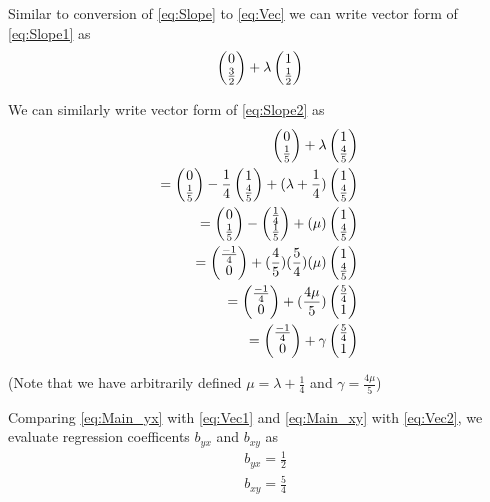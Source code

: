 \documentclass[journal,12pt,twocolumn]{IEEEtran}
\begin{document}
Similar to conversion of
\eqref{eq:Slope}
to
\eqref{eq:Vec}
we can write vector form of
\eqref{eq:Slope1}
as
\begin{align}
  \begin{pmatrix}0\\\frac{3}{2}\end{pmatrix} + \lambda\begin{pmatrix}1\\\frac{1}{2}\end{pmatrix}
  \label{eq:Vec1}  
\end{align}

We can similarly write vector form of
\eqref{eq:Slope2}
as
\begin{align}
  \begin{pmatrix}0\\\frac{1}{5}\end{pmatrix} + \lambda\begin{pmatrix}1\\\frac{4}{5}\end{pmatrix}
  \\
  = \begin{pmatrix}0\\\frac{1}{5}\end{pmatrix} - \frac{1}{4}\begin{pmatrix}1\\\frac{4}{5}\end{pmatrix} + (\lambda + \frac{1}{4})\begin{pmatrix}1\\\frac{4}{5}\end{pmatrix}
  \\
  = \begin{pmatrix}0\\\frac{1}{5}\end{pmatrix} - \begin{pmatrix}\frac{1}{4}\\\frac{1}{5}\end{pmatrix} + (\mu)\begin{pmatrix}1\\\frac{4}{5}\end{pmatrix}
  \\
  = \begin{pmatrix}\frac{-1}{4}\\0\end{pmatrix} + (\frac{4}{5})(\frac{5}{4})(\mu)\begin{pmatrix}1\\\frac{4}{5}\end{pmatrix}
  \\
  = \begin{pmatrix}\frac{-1}{4}\\0\end{pmatrix} + (\frac{4\mu}{5})\begin{pmatrix}\frac{5}{4}\\1\end{pmatrix}
  \\
  = \begin{pmatrix}\frac{-1}{4}\\0\end{pmatrix} + \gamma\begin{pmatrix}\frac{5}{4}\\1\end{pmatrix}
  \label{eq:Vec2}  
\end{align}

(Note that we have arbitrarily defined $\mu = \lambda + \frac{1}{4}$ and $\gamma = \frac{4\mu}{5}$)

Comparing
\eqref{eq:Main_yx} with \eqref{eq:Vec1}
and
\eqref{eq:Main_xy} with \eqref{eq:Vec2},
we evaluate regression coefficents $b_{yx}$ and $b_{xy}$ as
\begin{align}
  &b_{yx} = \frac{1}{2}
  \label{eq:Regression_yx}
  \\
  &b_{xy} = \frac{5}{4}
  \label{eq:Regression_xy}
\end{align}
\end{document}
